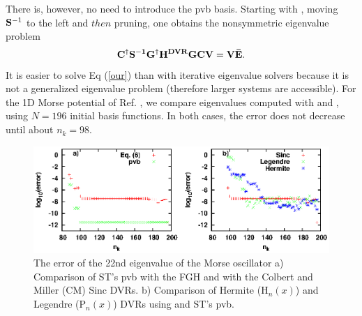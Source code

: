 There is, however,  no need to introduce the pvb basis.   Starting with ,  moving ${\bf{S}}^{-1}$ to the left and $then $
pruning, one obtains the nonsymmetric eigenvalue problem 
\begin{equation}\label{our}
\bf{C^{\dagger}  S^{-1}  G^{\dagger} H^{DVR} G  CV}={\bf{V  \bar{E}}}.
\end{equation} 
%
It is easier to solve    Eq (\ref{our}) than    with    iterative eigenvalue solvers  
 because  it is not a generalized eigenvalue problem
(therefore larger systems are accessible).  
%  
For the 1D Morse potential of  Ref. ,  we compare eigenvalues computed with      and ,
using  $N=196$ initial basis functions. 
%
In both cases, the error does not 
decrease until about $n_k = 98$.   
%
 \begin{figure}[ht]
 \includegraphics[width=6.5in]{PRL/fig_1ab.eps}%
 \caption[Comparison of different methods for the 22nd eigenvalue of the Morse oscillator]{The error of the 22nd eigenvalue of the Morse oscillator
\label{PRLfig.1} a) Comparison of ST's pvb with the FGH and  with the Colbert and Miller (CM)\cite{Colbert1992} Sinc DVRs. %
   b) Comparison of Hermite (H$_n(x)$) and Legendre (P$_n(x)$) DVRs using  and ST's pvb.}
 \end{figure}
%


